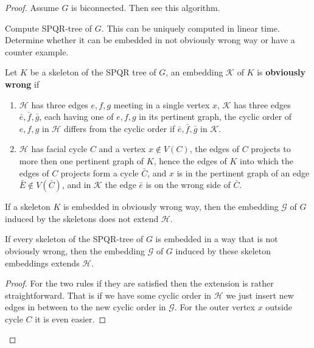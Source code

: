 \begin{proof}
	Assume $G$ is biconnected. Then see this algorithm.
	
	\begin{algorithm}[!ht]
		\begin{algorithmic}[1]
			\State Compute SPQR-tree of $G$. This can be uniquely computed in linear time.
				\State \Return
			\EndIf
				\State Determine whether it can be embedded in not obviously wrong way or have a counter example.
			\EndFor
		\end{algorithmic}
	\end{algorithm}

	\begin{defn}
		Let $K$ be a skeleton of the SPQR tree of $G$, an embedding $\mathcal{K}$ of $K$ is \textbf{obviously wrong} if
		
		\begin{enumerate}
			\item $\mathcal{H}$ has three edges $e,f,g$ meeting in a single vertex $x$, $\mathcal{K}$ has three edges $\bar{e}, \bar{f}, \bar{g}$, each having one of $e,f,g$ in its pertinent graph, the cyclic order of $e,f,g$ in $\mathcal{H}$ differs from the cyclic order if $\bar{e}, \bar{f}, \bar{g}$ in $\mathcal{K}$.
			\item $\mathcal{H}$ has facial cycle $C$ and a vertex $x \notin V(C)$, the edges of $C$ projects to more then one pertinent graph of $K$, hence the edges of $K$ into which the edges of $C$ projects form a cycle $\bar{C}$, and $x$ is in the pertinent graph of an edge $\bar{E} \notin V(\bar{C})$, and in $\mathcal{K}$ the edge $\bar{e}$ is on the wrong side of $\bar{C}$. 
		\end{enumerate}
	\end{defn}

	\begin{observ}
		If a skeleton $K$ is embedded in obviously wrong way, then the embedding $\mathcal{G}$ of $G$ induced by the skeletons does not extend $\mathcal{H}$.
	\end{observ}

	\begin{thm}
		If every skeleton of the SPQR-tree of $G$ is embedded in a way that is not obviously wrong, then the embedding $\mathcal{G}$ of $G$ induced by these skeleton embeddings extends $\mathcal{H}$.
	\end{thm}

	\begin{proof}
		For the two rules if they are satisfied then the extension is rather straightforward. That is if we have some cyclic order in $\mathcal{H}$ we just insert new edges in between to the new cyclic order in $\mathcal{G}$. For the outer vertex $x$ outside cycle $C$ it is even easier.
		

\end{proof}
\end{proof}
